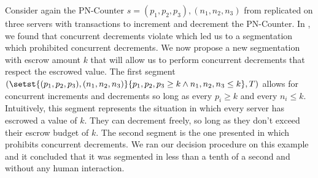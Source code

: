 Consider again the PN-Counter $s = (p_1, p_2, p_3), (n_1, n_2, n_3)$ from
 replicated on three servers with transactions
to increment and decrement the PN-Counter. In
, we found that concurrent decrements violate
\invariantconfluence{} which led us to a segmentation which prohibited
concurrent decrements. We now propose a new segmentation with escrow amount $k$
that will allow us to perform concurrent decrements that respect the escrowed
value. The first segment $(\setst{(p_1, p_2, p_3), (n_1, n_2, n_3)}{p_1, p_2,
p_3 \geq k \land n_1, n_2, n_3 \leq k}, T)$ allows for concurrent increments
and decrements so long as every $p_i \geq k$ and every $n_i \leq k$.
Intuitively, this segment represents the situation in which every server has
escrowed a value of $k$. They can decrement freely, so long as they don't
exceed their escrow budget of $k$. The second segment is the one presented in
 which prohibits concurrent decrements. We ran
our decision procedure on this example and it concluded that it was segmented
\invariantconfluent{} in less than a tenth of a second and without any human
interaction.

